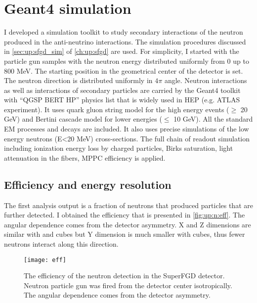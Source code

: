 \documentclass[main.tex]{subfiles}
\begin{document}
\section{Geant4 simulation}
I developed a simulation toolkit to study secondary interactions of the neutron produced in the anti-neutrino interactions. The simulation procedures discussed in \autoref{sec:up:sfgd_sim} of \autoref{ch:up:sfgd} are used. For simplicity, I started with the particle gun samples with the neutron energy distributed uniformly from 0 up to 800 MeV. The starting position in the geometrical center of the detector is set. The neutron direction is distributed uniformly in $4\pi$ angle. Neutron interactions as well as interactions of secondary particles are carried by the Geant4 toolkit with ``QGSP BERT HP'' physics list that is widely used in HEP (e.g. ATLAS experiment). It uses quark gluon string model for the high energy events ($\geqslant$ 20 GeV) and Bertini cascade model for lower energies ($\leqslant$ 10 GeV). All the standard EM processes and decays are included. It also uses precise simulations of the low energy neutrons (E<20 MeV) cross-sections. The full chain of readout simulation including ionization energy loss by charged particles, Birks saturation, light attenuation in the fibers, MPPC efficiency is applied.

\subsection{Efficiency and energy resolution}
The first analysis output is a fraction of neutrons that produced particles that are further detected. I obtained the efficiency that is presented in \autoref{fig:up:n:eff}. The angular dependence comes from the detector asymmetry. X and Z dimensions are similar with \sfgdx{} and \sfgdz{} cubes but Y dimension is much smaller with \sfgdy{} cubes, thus fewer neutrons interact along this direction.

\begin{figure}[!ht]
	\centering
	\texttt{[image: eff]}
	\caption{The efficiency of the neutron detection in the SuperFGD detector. Neutron particle gun was fired from the detector center isotropically. The angular dependence comes from the detector asymmetry.}
	\label{fig:up:n:eff}
\end{figure}
\end{document}
